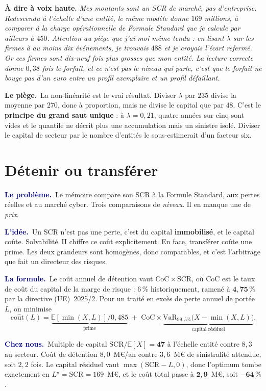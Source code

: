 \documentclass[11pt,a4paper]{article}
\providecommand{\E}{\mathbb{E}}
\newcommand{\lequoi}[1]{\smallskip\noindent\textcolor{navy}{\textbf{Le problème.}}\ #1\par}
\newcommand{\lidee}[1]{\smallskip\noindent\textcolor{navy}{\textbf{L'idée.}}\ #1\par}
\newcommand{\laformule}[1]{\smallskip\noindent\textcolor{navy}{\textbf{La formule.}}\ #1\par}
\newcommand{\cheznous}[1]{\smallskip\noindent\textcolor{navy}{\textbf{Chez nous.}}\ #1\par}
\newcommand{\lepiege}[1]{\smallskip\noindent\textcolor{accent}{\textbf{Le piège.}}\ #1\par}
\newcommand{\laphrase}[1]{\begin{phrasebox}\textbf{À dire à voix haute.} \emph{#1}\end{phrasebox}}
\begin{document}
\laphrase{Mes montants sont un SCR de \emph{marché}, pas d'entreprise. Redescendu à l'échelle
d'une entité, le même modèle donne $169$ millions, à comparer à la charge opérationnelle de
Formule Standard que je calcule par ailleurs à $450$. Attention au piège que j'ai moi-même
tendu : en lisant $\lambda$ sur les firmes à au moins dix événements, je trouvais $488$ et je
croyais l'écart refermé. Or ces firmes sont dix-neuf fois plus grosses que mon entité. La
lecture correcte donne $0{,}38$ fois le forfait, et ce n'est pas le niveau qui parle, c'est
que le forfait ne bouge pas d'un euro entre un profil exemplaire et un profil défaillant.}

\lepiege{La non-linéarité est le vrai résultat. Diviser $\lambda$ par $235$ divise la moyenne
par $270$, donc à proportion, mais ne divise le capital que par $48$. C'est le
\textbf{principe du grand saut unique} : à $\lambda=0{,}21$, quatre années sur cinq sont vides
et le quantile ne décrit plus une accumulation mais un sinistre isolé. Diviser le capital de
secteur par le nombre d'entités le sous-estimerait d'un facteur six.}

\section{Détenir ou transférer}

\lequoi{Le mémoire compare son SCR à la Formule Standard, aux pertes réelles et au marché
cyber. Trois comparaisons de \emph{niveau}. Il en manque une de \emph{prix}.}

\lidee{Un SCR n'est pas une perte, c'est du capital \textbf{immobilisé}, et le capital coûte.
Solvabilité~II chiffre ce coût explicitement. En face, transférer coûte une prime. Les deux
grandeurs sont homogènes, donc comparables, et c'est l'arbitrage que fait un directeur des
risques.}

\laformule{Le coût annuel de détention vaut $\mathrm{CoC}\times\mathrm{SCR}$, où
$\mathrm{CoC}$ est le taux de coût du capital de la marge de risque : $6\,\%$ historiquement,
ramené à $\mathbf{4{,}75\,\%}$ par la directive (UE)~2025/2. Pour un traité en excès de perte
annuel de portée $L$, on minimise
\[
  \mathrm{co\hat ut}(L)=\underbrace{\E[\min(X,L)]/0{,}485}_{\text{prime}}
  \;+\;\mathrm{CoC}\times\underbrace{\mathrm{VaR}_{99{,}5\%}\bigl(X-\min(X,L)\bigr)}_{\text{capital résiduel}} .
\]}

\cheznous{Multiple de capital $\mathrm{SCR}/\E[X]=\mathbf{47}$ à l'échelle entité contre $8{,}3$
au secteur. Coût de détention $8{,}0$~M\euro/an contre $3{,}6$~M\euro{} de sinistralité
attendue, soit $2{,}2$ fois. Le capital résiduel vaut $\max(\mathrm{SCR}-L,0)$, donc l'optimum
tombe exactement en $L^\star=\mathrm{SCR}=169$~M\euro, et le coût total passe à
$\mathbf{2{,}9}$~M\euro, soit $\mathbf{-64\,\%}$.}
\end{document}
